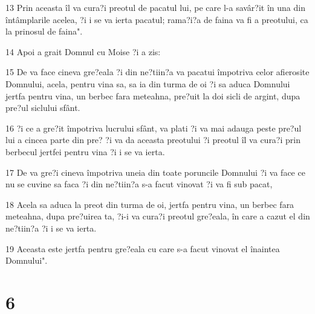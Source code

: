 \par 13 Prin aceasta îl va cura?i preotul de pacatul lui, pe care l-a savâr?it în una din întâmplarile acelea, ?i i se va ierta pacatul; rama?i?a de faina va fi a preotului, ca la prinosul de faina".
\par 14 Apoi a grait Domnul cu Moise ?i a zis:
\par 15 De va face cineva gre?eala ?i din ne?tiin?a va pacatui împotriva celor afierosite Domnului, acela, pentru vina sa, sa ia din turma de oi ?i sa aduca Domnului jertfa pentru vina, un berbec fara meteahna, pre?uit la doi sicli de argint, dupa pre?ul siclului sfânt.
\par 16 ?i ce a gre?it împotriva lucrului sfânt, va plati ?i va mai adauga peste pre?ul lui a cincea parte din pre? ?i va da aceasta preotului ?i preotul îl va cura?i prin berbecul jertfei pentru vina ?i i se va ierta.
\par 17 De va gre?i cineva împotriva uneia din toate poruncile Domnului ?i va face ce nu se cuvine sa faca ?i din ne?tiin?a s-a facut vinovat ?i va fi sub pacat,
\par 18 Acela sa aduca la preot din turma de oi, jertfa pentru vina, un berbec fara meteahna, dupa pre?uirea ta, ?i-i va cura?i preotul gre?eala, în care a cazut el din ne?tiin?a ?i i se va ierta.
\par 19 Aceasta este jertfa pentru gre?eala cu care s-a facut vinovat el înaintea Domnului".

\chapter{6}

